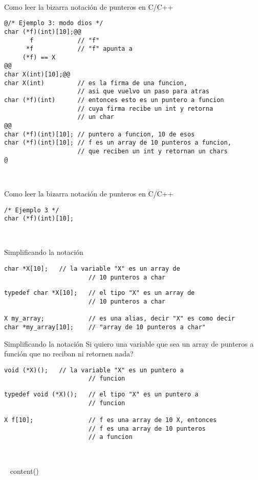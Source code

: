 ~%
\begin{frame}[fragile]{Como leer la bizarra notaci\'on de punteros en C/C++}
         \begin{lstlisting}[style=dimmided]
@/* Ejemplo 3: modo dios */
char (*f)(int)[10];@@
       f            // "f"
      *f            // "f" apunta a
     (*f) == X
@@
char X(int)[10];@@
char X(int)         // es la firma de una funcion,
                    // asi que vuelvo un paso para atras
char (*f)(int)      // entonces esto es un puntero a funcion
                    // cuya firma recibe un int y retorna
                    // un char
@@
char (*f)(int)[10]; // puntero a funcion, 10 de esos
char (*f)(int)[10]; // f es un array de 10 punteros a funcion,
                    // que reciben un int y retornan un chars
@
         \end{lstlisting}
\end{frame}
~%
\begin{frame}[fragile,t]{Como leer la bizarra notaci\'on de punteros en C/C++}
         \begin{lstlisting}[style=normal]
/* Ejemplo 3 */
char (*f)(int)[10];
         \end{lstlisting}
\end{frame}
~%


\begin{frame}[fragile]{Simplificando la notaci\'on}{}
         \begin{lstlisting}[style=normal]
        char *X[10];   // la variable "X" es un array de
                       // 10 punteros a char

         \end{lstlisting}
         \begin{lstlisting}[style=normal]
typedef char *X[10];   // el tipo "X" es un array de
                       // 10 punteros a char

X my_array;            // es una alias, decir "X" es como decir
char *my_array[10];    // "array de 10 punteros a char"

         \end{lstlisting}
\end{frame}

\begin{frame}[fragile]{Simplificando la notaci\'on}{}
Si quiero una variable que sea un array de punteros a funci\'on que no reciban ni retornen nada?
         \begin{lstlisting}[style=normal]
        void (*X)();   // la variable "X" es un puntero a
                       // funcion

         \end{lstlisting}
         \begin{lstlisting}[style=normal]
typedef void (*X)();   // el tipo "X" es un puntero a
                       // funcion

X f[10];               // f es una array de 10 X, entonces
                       // f es una array de 10 punteros
                       // a funcion
         \end{lstlisting}
\end{frame}

~%

~{ content() }~





